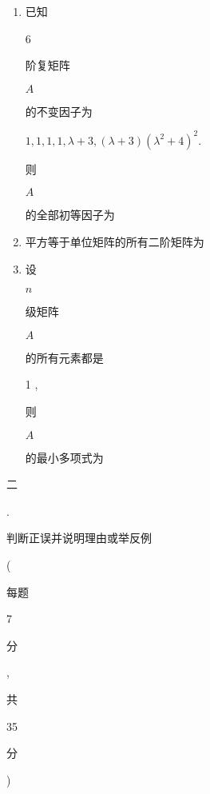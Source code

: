 \documentclass[10pt]{article}
\begin{document}
\begin{enumerate}
  \item \begin{CJK}{UTF8}{mj}已知\end{CJK} 6 \begin{CJK}{UTF8}{mj}阶复矩阵\end{CJK} $A$ \begin{CJK}{UTF8}{mj}的不变因子为\end{CJK} $1,1,1,1, \lambda+3,(\lambda+3)\left(\lambda^{2}+4\right)^{2}$. \begin{CJK}{UTF8}{mj}则\end{CJK} $A$ \begin{CJK}{UTF8}{mj}的全部初等因子为\end{CJK}

  \item \begin{CJK}{UTF8}{mj}平方等于单位矩阵的所有二阶矩阵为\end{CJK}

  \item \begin{CJK}{UTF8}{mj}设\end{CJK} $n$ \begin{CJK}{UTF8}{mj}级矩阵\end{CJK} $A$ \begin{CJK}{UTF8}{mj}的所有元素都是\end{CJK} 1 , \begin{CJK}{UTF8}{mj}则\end{CJK} $A$ \begin{CJK}{UTF8}{mj}的最小多项式为\end{CJK}

\end{enumerate}
\begin{CJK}{UTF8}{mj}二\end{CJK}. \begin{CJK}{UTF8}{mj}判断正误并说明理由或举反例\end{CJK} (\begin{CJK}{UTF8}{mj}每题\end{CJK} 7 \begin{CJK}{UTF8}{mj}分\end{CJK}, \begin{CJK}{UTF8}{mj}共\end{CJK} 35 \begin{CJK}{UTF8}{mj}分\end{CJK})
\end{document}
